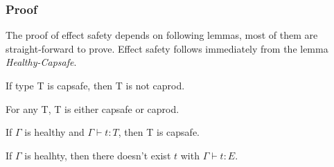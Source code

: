 \subsubsection{Proof}

The proof of effect safety depends on following lemmas, most of them
are straight-forward to prove. Effect safety follows immediately from
the lemma \emph{Healthy-Capsafe}.


\begin{lemma}
 If type T is capsafe, then T is not caprod.
\end{lemma}

\begin{lemma}
 For any T, T is either capsafe or caprod.
\end{lemma}



\begin{lemma}
  If $\Gamma$ is healthy and $\Gamma \vdash t : T$, then T is capsafe.
\end{lemma}

\begin{theorem}
  If $\Gamma$ is healhty, then there doesn't exist $t$ with
  $\Gamma \vdash t : E$.
\end{theorem}


